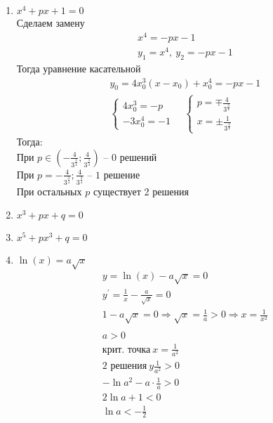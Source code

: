 		\subsection{}
		\begin{enumerate}
		\item $x^4 + px + 1 = 0$\\
			Сделаем замену
			\begin{gather*}
				x^4 = - px - 1\\
				y_1 = x^4,\ y_2 = - px - 1
			\end{gather*}
			Тогда уравнение касательной
			\begin{gather*}
				y_0 = 4x^3_0 (x - x_0) + x^4_0 = - px - 1\\
				\begin{cases}
					4x^3_0 = - p\\
					 - 3x^4_0 = - 1
				\end{cases}
				\quad
				\begin{cases}
					p = \mp \frac{4}{3^{\frac{3}{4}}}\\
					x = \pm \frac{1}{3^{\frac{3}{4}}}
				\end{cases}
			\end{gather*}
			Тогда:\\
			При $p \in ( - \frac{4}{3^{\frac{3}{4}}}; \frac{4}{3^{\frac{3}{4}}})$ -- $0$ решений\\
			При $p = - \frac{4}{3^{\frac{3}{4}}}; \frac{4}{3^{\frac{3}{4}}}$ -- $1$ решение\\
			При остальных $p$ существует 2 решения 
		\item $x^3 + px + q = 0$
		\item $x^5 + px^3 + q = 0$
		\item $\ln(x) = a\sqrt{x}$ 
			\begin{gather*}
				y = \ln(x) - a \sqrt{x} = 0\\
				y^{\prime} = \frac{1}{x} - \frac{a}{\sqrt{x}} = 0\\
				1 - a\sqrt{x} = 0 \Rightarrow \sqrt{x} = \frac{1}{a} > 0 \Rightarrow x = \frac{1}{x^2}\\
				\\
				a > 0\\
				\text{крит. точка}\ x = \frac{1}{a^{2}}\\
				\text{2 решения}\ y \frac{1}{a^2} > 0\\
				-\ln a^2 - a \cdot \frac{1}{a} > 0\\
				2\ln a + 1 < 0\\
				\ln a < -\frac{1}{2}\\

\end{gather*}
\end{enumerate}
